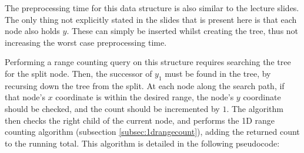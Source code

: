 \documentclass[paper=a4, fontsize=12pt]{article}
\begin{document}
The preprocessing time for this data structure is also similar to the lecture
slides. The only thing not explicitly stated in the slides that is present here
is that each node also holds \(y\). These can simply be inserted whilst
creating the tree, thus not increasing the worst case preprocessing time.

Performing a range counting query on this structure requires searching the tree
for the split node. Then, the successor of \(y_1\) must be found in the tree,
by recursing down the tree from the split. At each node along the search path,
if that node's \(x\) coordinate is within the desired range, the node's \(y\)
coordinate should be checked, and the count should be incremented by \(1\). The
algorithm then checks the right child of the current node, and performs the 1D
range counting algorithm (subsection \ref{subsec:1drangecount}), adding the
returned count to the running total. This algorithm is detailed in the
following pseudocode:
\end{document}
